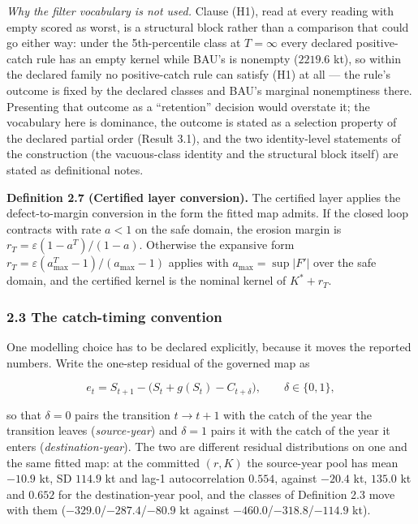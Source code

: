 \emph{Why the filter vocabulary is not used.} Clause (H1), read at every
reading with empty scored as worst, is a structural block rather than a
comparison that could go either way: under the 5th-percentile class at
\(T=\infty\) every declared positive-catch rule has an empty kernel
while BAU's is nonempty (\(2219.6\) kt), so within the declared family
no positive-catch rule can satisfy (H1) at all --- the rule's outcome is
fixed by the declared classes and BAU's marginal nonemptiness there.
Presenting that outcome as a ``retention'' decision would overstate it;
the vocabulary here is dominance, the outcome is stated as a selection
property of the declared partial order (Result 3.1), and the two
identity-level statements of the construction (the vacuous-class
identity and the structural block itself) are stated as definitional
notes.

\textbf{Definition 2.7 (Certified layer conversion).} The certified
layer applies the defect-to-margin conversion in the form the fitted map
admits. If the closed loop contracts with rate \(a < 1\) on the safe
domain, the erosion margin is \(r_T = \varepsilon(1-a^T)/(1-a)\).
Otherwise the expansive form
\(r_T = \varepsilon(a_{\max}^T - 1)/(a_{\max} - 1)\) applies with
\(a_{\max} = \sup|F'|\) over the safe domain, and the certified kernel
is the nominal kernel of \(K^* + r_T\).

\subsubsection{2.3 The catch-timing convention}\label{budget-the-catch-timing-convention}

One modelling choice has to be declared explicitly, because it moves the
reported numbers. Write the one-step residual of the governed map as

\[e_t = S_{t+1} - \bigl(S_t + g(S_t) - C_{t+\delta}\bigr),\qquad
\delta \in \{0, 1\},\]

so that \(\delta = 0\) pairs the transition \(t \to t+1\) with the catch
of the year the transition leaves (\emph{source-year}) and \(\delta = 1\)
pairs it with the catch of the year it enters
(\emph{destination-year}). The two are different residual distributions
on one and the same fitted map: at the committed \((r, K)\) the
source-year pool has mean \(-10.9\) kt, SD \(114.9\) kt and lag-1
autocorrelation \(0.554\), against \(-20.4\) kt, \(135.0\) kt and
\(0.652\) for the destination-year pool, and the classes of Definition 2.3
move with them (\(-329.0\)/\(-287.4\)/\(-80.9\) kt against
\(-460.0\)/\(-318.8\)/\(-114.9\) kt).

